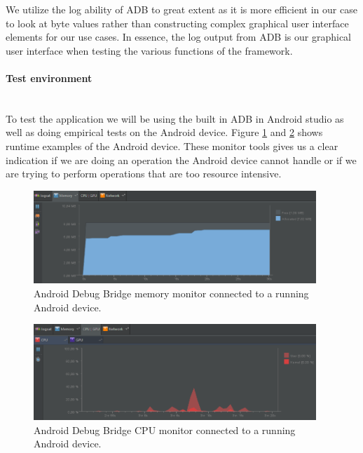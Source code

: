 We utilize the log ability of ADB to great extent as it is more efficient in our case to look at byte values rather than constructing complex graphical user interface elements for our use cases. In essence, the log output from ADB is our graphical user interface when testing the various functions of the framework.

\paragraph{Test environment}\mbox{}\\
To test the application we will be using the built in ADB in Android studio as well as doing empirical tests on the Android device. Figure \ref{fig:ADBMemory} and \ref{fig:ADBCPU} shows runtime examples of the Android device. These monitor tools gives us a clear indication if we are doing an operation the Android device cannot handle or if we are trying to perform operations that are too resource intensive.

\begin{figure}[h!]
  \captionsetup{justification=centering,margin=1.5cm}
  \caption{Android Debug Bridge memory monitor connected to a running Android device.}
  \label{fig:ADBMemory}
  \centering
    \includegraphics[width=0.95\textwidth]{images/ADBMemory.png}
\end{figure}

\begin{figure}[h!]
  \captionsetup{justification=centering,margin=1.5cm}
  \caption{Android Debug Bridge CPU monitor connected to a running Android device.}
  \label{fig:ADBCPU}
  \centering
    \includegraphics[width=0.95\textwidth]{images/ADBCPU.png}
\end{figure}

